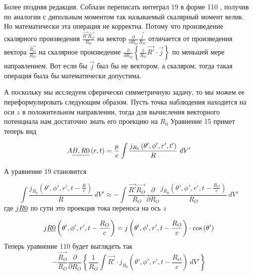 \documentclass[11pt]{article}
\begin{document}
Более поздняя редакция. Соблазн переписать интеграл 19 в форме 110 ,
получив по аналогии с дипольным моментом так называемый скалярный момент
велик. Но математически эта операция не корректна. Потому что
произведение скалярного
произведения
\(\frac{\overrightarrow{R'}\overrightarrow{{{R}_{O}}}}{{{R}_{O}}}\)
на вектор
\(\frac{\partial }{\partial {{R}_{O}}}\frac{\overrightarrow{j}}{{{R}_{O}}}\)
отличается от произведения вектора
\(\frac{\overrightarrow{{{R}_{O}}}}{{{R}_{O}}}\) на скалярное
произведение \(\frac{\partial }{\partial {{R}_{O}}}\left\{
\frac{1}{{{R}_{O}}}\overrightarrow{R'}\cdot \overrightarrow{j}
\right\}\) по меньшей мере направлением. Вот если бы
\(\overrightarrow{j}\) был бы не вектором, а скаляром, тогда такая
операция была бы математически допустима.


А поскольку мы исследуем
сферически симметричную задачу, то мы можем ее переформулировать
следующим образом. Пусть точка наблюдения находится на оси \(z\) в
положительном направлении, тогда для вычисления векторного потенциала
нам достаточно знать его проекцию на \({{R}_{0}}\) Уравнение 15 примет
теперь вид

\begin{equation}{{A}\emph{{B,{{R}}{0}}}}\left( r,t
\right)=\frac{\mu }{c}\int{\frac{{{j}_{{{R}_{0}}}}\left( \theta ',\phi ',r',t' \right)}{R}}~dV'
\end{equation}

А уравнение 19 становится

\begin{equation}
\int{\frac{{{j}_{{{R}_{0}}}}\left( \theta ',\phi ',r',t-\frac{R}{c} \right)}{R}}~dV'\approx -\int{\frac{\overrightarrow{R'}\overrightarrow{{{R}_{O}}}}{{{R}_{O}}}\frac{\partial }{\partial {{R}_{O}}}\frac{{{j}_{{{R}_{0}}}}\left( \theta ',\phi ',r',t-\frac{{{R}_{O}}}{c} \right)}{{{R}_{O}}}\ dV'}
\end{equation}
где \({{j}\emph{{{{R}}{0}}}}\) по сути это проекция тока переноса на ось \(z\)

\begin{equation}
{{j}\emph{{{{R}}{0}}}}\left(
\theta ',\phi ',r',t-\frac{{{R}_{O}}}{c} \right)=j\left(
\theta ',\phi ',r',t-\frac{{{R}_{O}}}{c} \right)\cdot \cos \left(
\theta ' \right)
\end{equation}
Теперь уравнение 110 будет выглядеть так
\begin{equation}
-\frac{\overrightarrow{{{R}_{O}}}}{{{R}_{O}}}\frac{\partial }{\partial {{R}_{O}}}\left\{
\frac{1}{{{R}_{O}}}\int{\overrightarrow{R'}\cdot {{j}_{{{R}_{0}}}}\left( \theta ',\phi ',r',t-\frac{{{R}_{O}}}{c} \right)}~dV'
\right\}
\end{equation}
\end{document}
